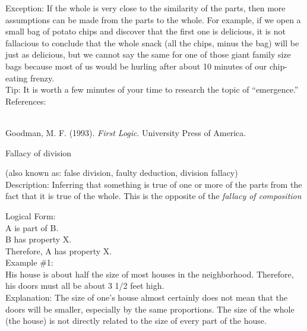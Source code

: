 \documentclass[a4paper,12pt,single,pdftex]{scrbook}
\begin{document}
    
      Exception: If the whole is very close to the similarity of the parts, then more assumptions can be made from the parts to the whole.  For example, if we open a small bag of potato chips and discover that the first one is delicious, it is not fallacious to conclude that the whole snack (all the chips, minus the bag) will be just as delicious, but we cannot say the same for one of those giant family size bags because most of us would be hurling after about 10 minutes of our chip-eating frenzy.
    \\

    
      Tip: It is worth a few minutes of your time to research the topic of “emergence.” 
    \\

    References:

    
      
        
      \\

      
        
          Goodman, M. F. (1993). {\it First Logic}. University Press of America.
        
      
    
  

Fallacy of division
    
      (also known as: false division, faulty deduction, division fallacy)
    \\

  
    Description: Inferring that something is true of one or more of the parts from the fact that it is true of the whole.  This is the opposite of the {\it fallacy of composition} 

    
      Logical Form:
    \\

    
      A is part of B.
    \\

    
      B has property X.
    \\

    
      Therefore, A has property X.
    \\

    
      Example \#1:
    \\

    
      His house is about half the size of most houses in the neighborhood. Therefore, his doors must all be about 3 1/2 feet high.
    \\

    
      Explanation: The size of one’s house almost certainly does not mean that the doors will be smaller, especially by the same proportions.  The size of the whole (the house) is not directly related to the size of every part of the house.
    \\
\end{document}
